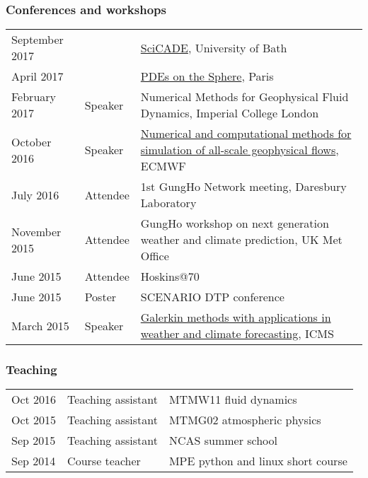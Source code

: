 \documentclass[a4paper,11pt]{article}
\begin{document}
\subsubsection*{Conferences and workshops}
\begin{tabularx}{\linewidth}{l l X}
September 2017 & & \href{https://sites.google.com/site/scicade2017/}{SciCADE}, University of Bath \\
April 2017 & & \href{https://forge.ipsl.jussieu.fr/heat/wiki/PDEs2017}{PDEs on the Sphere}, Paris \\
February 2017 & Speaker & Numerical Methods for Geophysical Fluid Dynamics, Imperial College London \\
October 2016 & Speaker & \href{http://www.ecmwf.int/en/learning/workshops-and-seminars/workshop-numerical-and-computational-methods-simulation-all-scale-geophysical-flows}{Numerical and computational methods for simulation of all-scale geophysical flows}, ECMWF \\
July 2016 & Attendee & 1st GungHo Network meeting, Daresbury Laboratory \\
November 2015 & Attendee & GungHo workshop on next generation weather and climate prediction, UK Met Office \\
June 2015 & Attendee & Hoskins@70 \\
June 2015 & Poster & SCENARIO DTP conference \\
March 2015 & Speaker & \href{http://www.icms.org.uk/workshop.php?id=334}{Galerkin methods with applications in weather and climate forecasting}, ICMS \\
\end{tabularx}

\subsubsection*{Teaching}
\begin{tabular}{l l l}
Oct 2016 & Teaching assistant & MTMW11 fluid dynamics \\
Oct 2015 & Teaching assistant & MTMG02 atmospheric physics \\
Sep 2015 & Teaching assistant & NCAS summer school \\
Sep 2014 & Course teacher & MPE python and linux short course \\
\end{tabular}
\end{document}
